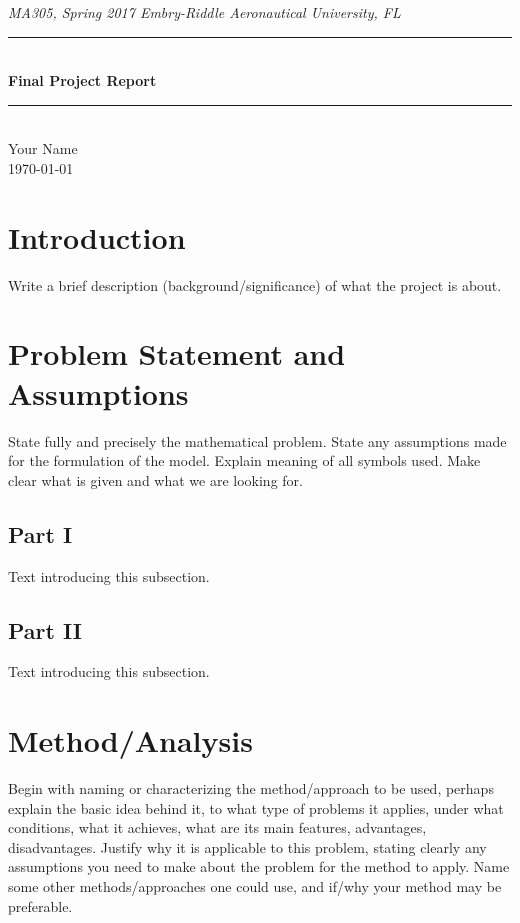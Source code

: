 \documentclass[11pt]{article}
\newcommand{\horrule}[1]{\rule{\linewidth}{#1}} 	%
\begin{document}
\begin{center}
{\it MA305, Spring 2017 \hfill Embry-Riddle Aeronautical University, FL 
 }
		\horrule{0.5pt} \\[0.4cm]
		{\bf \Large  Final Project Report}\\
		\horrule{2pt} \\[2cm]
Your Name %
\\[0.4cm]
\today %
\end{center}
\thispagestyle{empty}
\newpage
\begin{abstract}

\end{abstract}
\tableofcontents 
\newpage

\section{Introduction}\label{S:1}
Write a brief description (background/significance) of what the project is about. 


\section{Problem Statement and Assumptions}\label{S:2}
State fully and precisely the mathematical problem. 
State any assumptions made for the formulation of the model. 
Explain meaning of all symbols used. Make clear what is given and what we are looking for. 

\subsection{Part I}\label{S:2.1}
%
Text introducing this subsection. 

\subsection{Part II}\label{S:2.2}
%
Text introducing this subsection.

\section{Method/Analysis}\label{S:3}
Begin with naming or characterizing the method/approach to be used, perhaps explain the basic idea behind it, to what type of problems it applies, under what conditions, what it achieves, what are its main features, advantages, disadvantages. Justify why it is applicable to this problem, stating clearly any assumptions you need to make about the problem for the method to apply. Name some other methods/approaches one could use, and if/why your method may be preferable.
\end{document}
